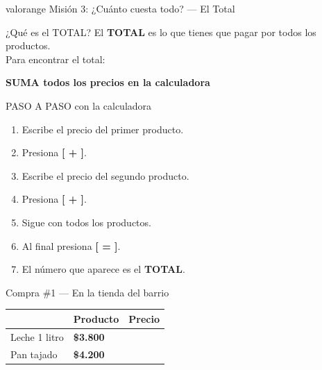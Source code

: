 \documentclass[12pt]{article}
\begin{document}
\newpage

\begin{mision}{valorange}{\; Misión 3: ¿Cuánto cuesta todo?
  --- El Total}

\begin{aprender}{¿Qué es el TOTAL?}
El \textbf{TOTAL} es lo que tienes que pagar por todos los productos.\\[0.2cm]
Para encontrar el total:\\[0.2cm]
\begin{center}
  \Large
  \textbf{SUMA todos los precios en la calculadora}
\end{center}
\end{aprender}

\vspace{0.3cm}

\begin{paso}{PASO A PASO con la calculadora}
\begin{enumerate}[label=\textbf{Paso \arabic*.}, leftmargin=2cm,
    itemsep=0.2cm]
  \item Escribe el precio del primer producto.
  \item Presiona \textbf{[ + ]}.
  \item Escribe el precio del segundo producto.
  \item Presiona \textbf{[ + ]}.
  \item Sigue con todos los productos.
  \item Al final presiona \textbf{[ = ]}.
  \item El número que aparece es el \textbf{TOTAL}.
\end{enumerate}
\end{paso}

\vspace{0.4cm}

\begin{actividad}{Compra \#1 --- En la tienda del barrio}

\renewcommand{\arraystretch}{1.7}
\begin{center}
\begin{tabular}{|m{0.5cm}|m{6cm}|m{4cm}|}
  \hline
  \rowcolor{valorange!25}
  & \textbf{Producto} & \textbf{Precio} \\
  \hline
  Leche 1 litro & \textbf{\$3.800} \\
  \hline
  Pan tajado & \textbf{\$4.200} \\
  \hline
\end{tabular}
\end{center}


\end{actividad}
\end{mision}
\end{document}
